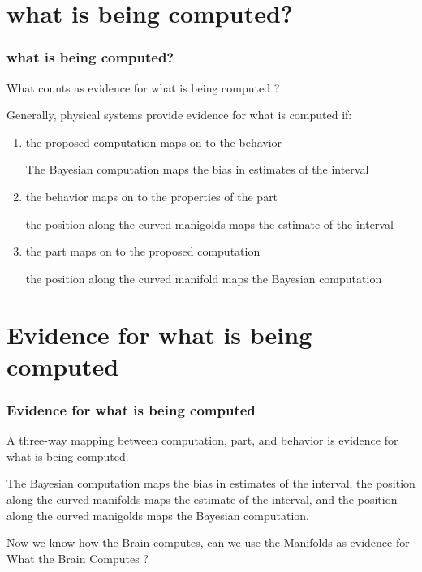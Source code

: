 \documentclass{beamer}
\begin{document}
\section{what is being computed?}
\begin{frame}
\frametitle{\textbf{what is being computed?} }
What counts as evidence for what is being computed ?

Generally, physical systems provide evidence for what is computed if:

\begin{enumerate}
    \item the proposed computation maps on to the behavior
    
    The Bayesian computation maps the bias in estimates of the interval

    \item the behavior maps on to the properties of the part
    
    the position along the curved manigolds maps the estimate of the interval

    \item the part maps on to the proposed computation
    
    the position along the curved manifold maps the Bayesian computation
\end{enumerate}

\end{frame}


\section{Evidence for what is being computed}
\begin{frame}
\frametitle{\textbf{Evidence for what is being computed} }
A three-way mapping between computation, part, and behavior is evidence for what is being computed.

The Bayesian computation maps the bias in estimates of the interval, the position along the curved manifolds maps the estimate of the interval, and the position along the curved manigolds maps the Bayesian computation.

Now we know how the Brain computes, can we use the Manifolds as evidence for What the Brain Computes ?


\end{frame}
\end{document}
